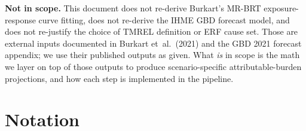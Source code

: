\documentclass[11pt]{article}
\begin{document}
\begin{tcolorbox}[colback=blue!5,colframe=blue!50!black,title=Scope: what
this document is NOT]
\textbf{Not in scope.} This document does not re-derive Burkart's
MR-BRT exposure-response curve fitting, does not re-derive the IHME GBD
forecast model, and does not re-justify the choice of TMREL definition or
ERF cause set. Those are external inputs documented in Burkart et~al.\
(2021) and the GBD 2021 forecast appendix; we use their published outputs
as given. What \emph{is} in scope is the math we layer on top of those
outputs to produce scenario-specific attributable-burden projections, and
how each step is implemented in the pipeline.
\end{tcolorbox}

\section{Notation}
\end{document}
